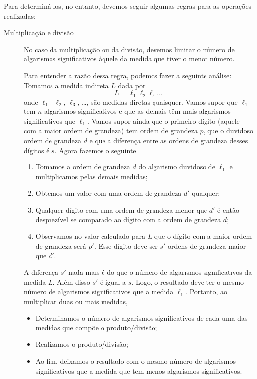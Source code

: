 Para determiná-los, no entanto, devemos seguir algumas regras para as operações realizadas:
\begin{description}
	\item[Multiplicação e divisão] No caso da multiplicação ou da divisão, devemos limitar o número de algarismos significativos àquele da medida que tiver o menor número.
	
	Para entender a razão dessa regra, podemos fazer a seguinte análise: Tomamos a medida indireta $L$ dada por
\begin{equation}
	L = \ell_1\ell_2\ell_3\dots
\end{equation}
%
onde $\ell_1$, $\ell_2$, $\ell_3$, \dots, são medidas diretas quaisquer. Vamos supor que $\ell_1$ tem $n$ algarismos significativos e que as demais têm mais algarismos significativos que $\ell_1$. Vamos supor ainda que o primeiro dígito (aquele com a maior ordem de grandeza) tem ordem de grandeza $p$, que o duvidoso ordem de grandeza $d$ e que a diferença entre as ordens de grandeza desses dígitos é $s$. Agora fazemos o seguinte
		\begin{enumerate}
			\item Tomamos a ordem de grandeza $d$ do algarismo duvidoso de $\ell_1$ e multiplicamos pelas demais medidas;
			\item Obtemos um valor com uma ordem de grandeza $d'$ qualquer;
			\item Qualquer dígito com uma ordem de grandeza menor que $d'$ é então desprezível se comparado ao dígito com a ordem de grandeza $d$;
			\item Observamos no valor calculado para $L$ que o dígito com a maior ordem de grandeza será $p'$. Esse dígito deve ser $s'$ ordens de grandeza maior que $d'$.
		\end{enumerate}
%
A diferença $s'$ nada mais é do que o número de algarismos significativos da medida $L$. Além disso $s'$ é igual a $s$. Logo, o resultado deve ter o mesmo número de algarismos significativos que a medida $\ell_1$. Portanto, ao multiplicar duas ou mais medidas,
	\begin{itemize}
		\item Determinamos o número de algarismos significativos de cada uma das medidas que compõe o produto/divisão;
		\item Realizamos o produto/divisão;
		\item Ao fim, deixamos o resultado com o mesmo número de algarismos significativos que a medida que tem menos algarismos significativos.
	\end{itemize}
	

\end{description}
